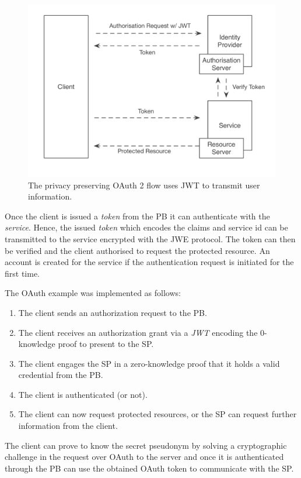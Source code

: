 \begin{figure}
\includegraphics[width=\textwidth]{figures/PrivateFlow.png}
\caption[Privacy Preserving OAuth Flow with JWT.]{The privacy preserving OAuth 2 flow uses JWT to transmit user information.
\label{fig:privateflow}}
\end{figure}

Once the client is issued a \emph{token} from the PB it can authenticate with the \emph{service}. Hence, the issued \emph{token} which encodes the claims and service id can be transmitted to the service encrypted with the JWE protocol. The token can then be verified and the client authorised to request the protected resource. An account is created for the service if the authentication request is initiated for the first time.

The OAuth example was implemented as follows:

\begin{enumerate}
    \item The client sends an authorization request to the PB.
    \item The client receives an authorization grant via a \emph{JWT} encoding the 0-knowledge proof to present to the SP.
    \item The client engages the SP in a zero-knowledge proof that it holds a valid credential from the PB.
    \item The client is authenticated (or not).
    \item The client can now request protected resources, or the SP can request further information from the client.
\end{enumerate}

The client can prove to know the secret pseudonym by solving a cryptographic challenge in the request over OAuth to the server and once it is authenticated through the PB can use the obtained OAuth token to communicate with the SP. 

